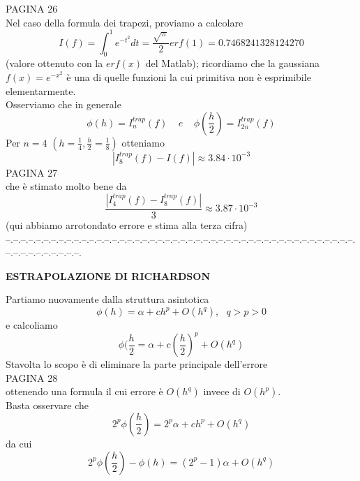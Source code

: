 \documentclass[12pt,a4paper]{article}
\begin{document}
PAGINA 26\\%
Nel caso della formula dei trapezi, proviamo a calcolare 
\begin{equation*}
    I(f)=\int_0^1e^{-t^2}dt=\frac{\sqrt{\pi}}{2}erf(1)=0.7468241328124270
\end{equation*}
(valore ottenuto con la $erf(x)$ del Matlab); ricordiamo che la gaussiana $f(x)=e^{-x^2}$ è una di quelle funzioni la cui primitiva non è esprimibile elementarmente.\\Osserviamo che in generale 
\begin{equation*}
    \phi(h)=I_n^{trap}(f)\  \  \  \  \ e \  \  \  \  \ \phi(\frac{h}{2})=I_{2n}^{trap}(f)
\end{equation*}
Per $n=4$ $(h=\frac{1}{4},\frac{h}{2}=\frac{1}{8})$ otteniamo
\begin{equation*}
    |I_8^{trap}(f)-I(f)|\approx3.84\cdot 10^{-3}
\end{equation*}
PAGINA 27\\%
che è stimato molto bene da
\begin{equation*}
    \frac{|I_4^{trap}(f)-I_8^{trap}(f)|}{3}\approx3.87\cdot 10^{-3}
\end{equation*}
(qui abbiamo arrotondato errore e stima alla terza cifra)\\
--.--.--.--.--.--.--.--.--.--.--.--.--.--.--.--.--.--.--.--.--.--.--.--.--.--.--.--.--.--.--.--.--.--.--.--.--.--.--.--.--.--.--.--.--.--.--.--.--.--.--.--.--.--.--.--.\\
\begin{center}
    
        \textbf{ESTRAPOLAZIONE DI RICHARDSON}
\end{center}
Partiamo nuovamente dalla struttura asintotica
\begin{equation*}
    \phi(h)=\alpha+ch^p+O(h^q),\  \  \ q>p>0
\end{equation*}
e calcoliamo 
\begin{equation*}
    \phi(\frac{h}{2}=\alpha+c(\frac{h}{2})^p+O(h^q)
\end{equation*}
Stavolta lo scopo è di eliminare la parte principale dell'errore\\
PAGINA 28\\
ottenendo una formula il cui errore è $O(h^q)$ invece di $O(h^p)$.\\Basta osservare che
\begin{equation*}
    2^p\phi(\frac{h}{2})=2^p\alpha+ch^p+O(h^q)
\end{equation*}
da cui
\begin{equation*}
    2^p\phi(\frac{h}{2})-\phi(h)=(2^p-1)\alpha+O(h^q)
\end{equation*}
\end{document}
